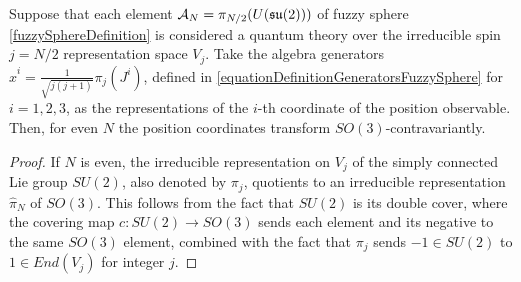 \begin{proposition}\label{propositionMadoreISSO3Covariant}
Suppose that each element $\mathcal A_N = \pi_{N/2}(U(\mathfrak{su}(2)))$ of fuzzy sphere \ref{fuzzySphereDefinition} is considered a quantum theory over the irreducible spin $j = N/2$ representation space $V_{j}$. Take the algebra generators $\hat x^i = \frac{1}{\sqrt{j(j+1)}}\pi_j(J^i)$, defined in \ref{equationDefinitionGeneratorsFuzzySphere} for $i = 1, 2, 3$, as the representations of the $i$-th coordinate of the position observable. Then, for even $N$ the position coordinates transform $SO(3)$-contravariantly.
\end{proposition}
\begin{proof}
If $N$ is even, the irreducible representation on $V_j$ of the simply connected Lie group $SU(2)$, also denoted by $\pi_j$, quotients to an irreducible representation $\hat \pi_N$ of $SO(3)$. This follows from the fact that $SU(2)$ is its double cover, where the covering map $c:SU(2) \to SO(3)$ sends each element and its negative to the same $SO(3)$ element, combined with the fact that $\pi_j$ sends $-1 \in SU(2)$ to $1 \in End(V_j)$ for integer $j$.


\end{proof}
